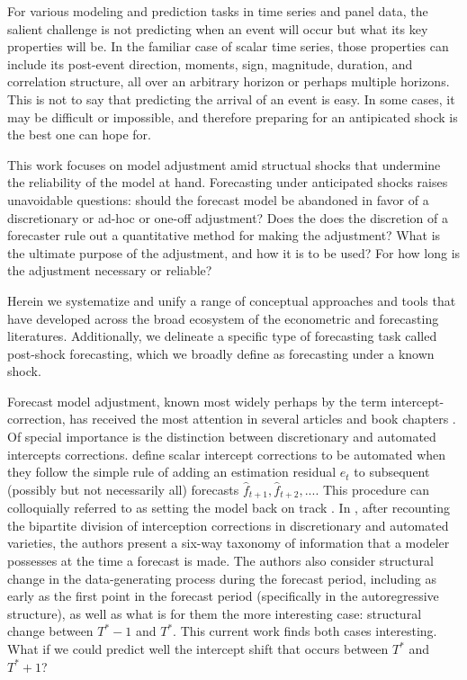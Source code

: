 \documentclass[11pt]{article}
\theoremstyle{definition}
\begin{document}
For various modeling and prediction tasks in time series and panel data, the salient challenge is not predicting when an event will occur but what its key properties will be.  In the familiar case of scalar time series, those properties can include its post-event direction, moments, sign, magnitude, duration, and correlation structure, all over an arbitrary horizon or perhaps multiple horizons. This is not to say that predicting the arrival of an event is easy. In some cases, it may be difficult or impossible, and therefore preparing for an antipicated shock is the best one can hope for.

This work focuses on model adjustment amid structual shocks that undermine the reliability of the  model at hand.  Forecasting under anticipated shocks raises unavoidable questions: should the forecast model be abandoned in favor of a discretionary or ad-hoc or one-off adjustment?  Does the does the discretion of a forecaster rule out a quantitative method for making the adjustment?  What is the ultimate purpose of the adjustment, and how it is to be used?  For how long is the adjustment necessary or reliable?

Herein we systematize and unify a range of conceptual approaches and tools that have developed across the broad ecosystem of the econometric and forecasting literatures.  Additionally, we delineate a specific type of forecasting task called post-shock forecasting, which we broadly define as forecasting under a known shock.

Forecast model adjustment, known most widely perhaps by the term intercept-correction, has received the most attention in several articles and book chapters \citep{hendry1994theory,clements1996intercept,clements1998forecasting}.  Of special importance is the distinction between discretionary and automated intercepts corrections. \cite{hendry1994theory} define scalar intercept corrections to be automated when they follow the simple rule of adding an estimation residual $e_{t}$ to subsequent (possibly but not necessarily all) forecasts $\hat f_{t+1},\hat f_{t+2},...$.  This procedure can colloquially referred to as setting the model back on track \citep{hendry1994theory}.  In \cite{hendry1994theory}, after recounting the bipartite division of interception corrections in discretionary and automated varieties, the authors present a six-way taxonomy of information that a modeler possesses at the time a forecast is made.  The authors also consider structural change in the data-generating process during the forecast period, including as early as the first point in the forecast period (specifically in the autoregressive structure), as well as what is for them the more interesting case: structural change between $T^{*}-1$ and $T^{*}$.  This current work finds both cases interesting.  What if we could predict well the intercept shift that occurs between $T^{*}$ and $T^{*}+1$?
\end{document}

